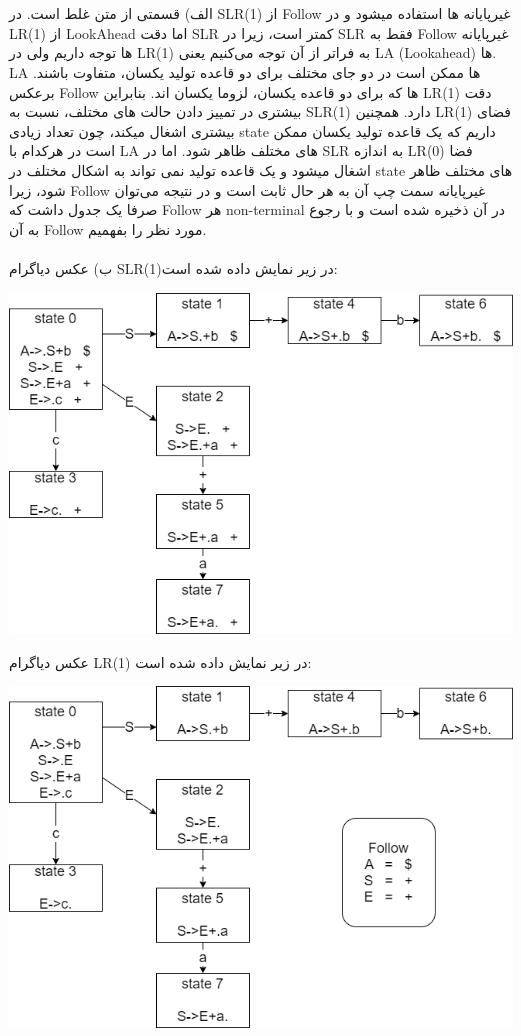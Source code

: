 
\\\\
الف) قسمتی از متن غلط است. در SLR(1) از Follow غیرپایانه ها استفاده میشود و در LR(1) از LookAhead‌ اما دقت SLR کمتر است، زیرا در SLR فقط به Follow غیرپایانه ها توجه داریم ولی در LR(1) به فراتر از آن توجه می‌کنیم یعنی LA (Lookahead) ها. LA ها ممکن است در دو جای مختلف برای دو قاعده تولید یکسان، متفاوت باشند. برعکس Follow ها که برای دو قاعده یکسان، لزوما یکسان اند. بنابراین LR(1) دقت بیشتری در تمییز دادن حالت های مختلف، نسبت به SLR(1) دارد. همچنین LR(1) فضای بیشتری اشغال میکند، چون تعداد زیادی state داریم که یک قاعده تولید یکسان ممکن است در هرکدام با LA های مختلف ظاهر شود. اما در SLR به اندازه LR(0) فضا اشغال میشود و یک قاعده تولید نمی تواند به اشکال مختلف در state های مختلف ظاهر شود، زیرا Follow غیرپایانه سمت چپ آن به هر حال ثابت است و در نتیجه می‌توان صرفا یک جدول داشت که Follow هر non-terminal در آن ذخیره شده است و با رجوع به آن Follow مورد نظر را بفهمیم.
\\\\
ب) عکس دیاگرام SLR(1)در زیر نمایش داده شده است:
\graphicspath{{./images/}}
\begin{center}
	\includegraphics[scale=0.7]{compiler_hw2_q10_1}
\end{center}
عکس دیاگرام LR(1) در زیر نمایش داده شده است:
\graphicspath{{./images/}}
\begin{center}
	\includegraphics[scale=0.7]{compiler_hw2_q10_2}
\end{center}
